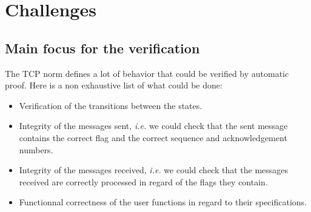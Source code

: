 \documentclass[a4paper, 10pt]{article}
\begin{document}


    \section{Challenges}

    \subsection{Main focus for the verification}

    The TCP norm defines a lot of behavior that could be verified by automatic proof.
    Here is a non exhaustive list of what could be done:
    \begin{itemize}
        \item Verification of the transitions between the states.
        \item Integrity of the messages sent, \textit{i.e.} we could check that the sent
        message contains the correct flag and the correct sequence and acknowledgement numbers.
        \item Integrity of the messages received, \textit{i.e.} we could check that the
        messages received are correctly processed in regard of the flags they contain.
        \item Functionnal correctness of the user functions in regard to their specifications.
    \end{itemize}
\end{document}
